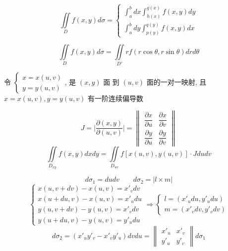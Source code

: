 \begin{definition}[直角坐标系]
	$$\iint\limits_{D}f(x,y)d\sigma = 
	\begin{cases} 
		\int_{a}^{b}dx\int_{h(x)}^{g(x)}f(x,y)dy \\
		\int_{a}^{b}dy\int_{p(y)}^{q(y)}f(x,y)dx
	\end{cases}$$
\end{definition}

\begin{definition}[极坐标系]
	$$\iint\limits_{D}f(x,y)d\sigma=\iint\limits_{D'}rf(r\cos \theta,r\sin \theta)drd\theta$$
\end{definition}

\begin{definition}[换元法]
	令 $\begin{cases}
	  x = x(u,v)\\
	  y = y(u,v)
	\end{cases}$, 是 $(x,y)$ 面 到 $(u,v)$ 面的一对一映射, 且 $x = x(u,v), y = y(u,v)$ 有一阶连续偏导数
	
	$$J = \big|\dfrac{\partial (x,y)}{\partial (u,v)}\big| = 
	\begin{Vmatrix}
	  \dfrac{\partial x}{\partial u} & \dfrac{\partial x}{\partial v} \\
	  \dfrac{\partial y}{\partial u} & \dfrac{\partial y}{\partial v}
	\end{Vmatrix}
	$$
	$$\iint\limits_{D_{xy}} f(x,y)dxdy = \iint\limits_{D_{uv}} f\left[x(u,v),y(u,v)\right]\cdot Jdudv$$
\end{definition}

\begin{anymark}[变量替换]
	$$d\sigma_{1}=dudv \qquad d\sigma_{2}=|l\times m|$$
	$$\begin{cases}
		x(u,v+dv)-x(u,v)=x'_{v}dv \\
		x(u+du,v)-x(u,v)=x'_{u}du \\
		y(u,v+dv)-y(u,v)=x'_{v}dv \\
		y(u+du,v)-y(u,v)=y'_{u}du
	 \end{cases}\Rightarrow 
	 \begin{cases}
		l=(x'_{u}du,y'_{u}du) \\
		m=(x'_{v}dv,y'_{v}dv)  
	\end{cases}$$
	$$d\sigma_{2}=(x'_{u}y'_{v}-x'_{v}y'_{u})dvdu=\begin{Vmatrix}
			x'_{u} & x'_{v} \\
			y'_{u} & y'_{v}
		\end{Vmatrix}d\sigma_{1}$$
\end{anymark}

